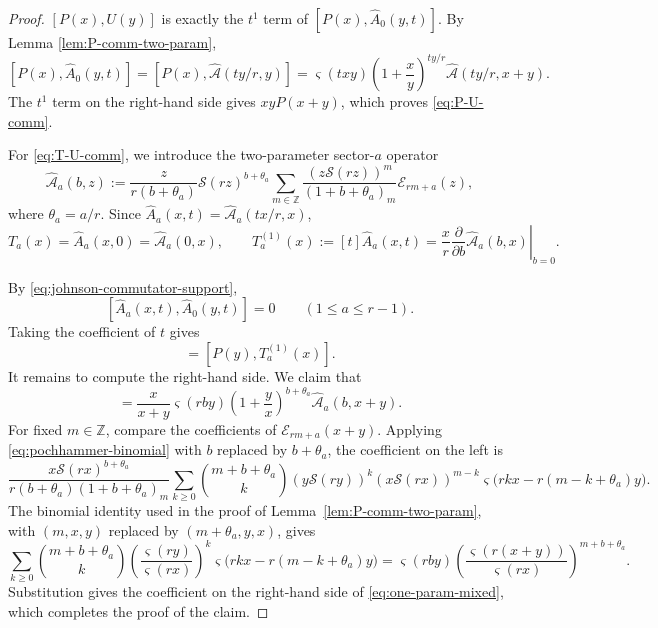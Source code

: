\documentclass[letterpaper,12pt]{amsart}
\theoremstyle{definition}
\newcommand{\Scal}{\mathcal S}
\newcommand{\Ecal}{\mathcal E}
\newcommand{\Z}{\mathbb Z}
\newcommand{\vars}{\varsigma}
\numberwithin{equation}{section}
\begin{document}
\begin{proof}
    $[P(x),U(y)]$ is exactly the $t^1$ term of $[P(x),\widehat A_0(y,t)]$. By Lemma \ref{lem:P-comm-two-param}, 
\[
  [P(x),\widehat A_0(y,t)]=[P(x),\widehat {\mathcal A}(ty/r,y)]
  =\vars(txy)\left(1+\frac xy\right)^{ty/r}\widehat {\mathcal A}(ty/r,x+y).
\]
The $t^1$ term on the right-hand side gives \(xyP(x+y)\), which proves \eqref{eq:P-U-comm}.

For \eqref{eq:T-U-comm}, we introduce the two-parameter sector-\(a\) operator
\[
  \widehat{\mathcal A}_a(b,z)
  :=
  \frac{z}{r(b+\theta_a)}\Scal(rz)^{b+\theta_a}
  \sum_{m\in\Z}
  \frac{(z\Scal(rz))^m}{(1+b+\theta_a)_m}\Ecal_{rm+a}(z),
\]
where \(\theta_a=a/r\).  Since
\(\widehat A_a(x,t)=\widehat{\mathcal A}_a(tx/r,x)\),
\begin{equation}
  T_a(x)
  =
  \widehat A_a(x,0)
  =
  \widehat{\mathcal A}_a(0,x),
  \qquad
  T_a^{(1)}(x)
  :=
  [t]\widehat A_a(x,t)
  =
  \frac{x}{r}
  \left.
    \frac{\partial}{\partial b}\widehat{\mathcal A}_a(b,x)
  \right|_{b=0}.
  \label{eq:Ta1-from-b}
\end{equation}

By
\eqref{eq:johnson-commutator-support},
\[
  [\widehat A_a(x,t),\widehat A_0(y,t)]=0
  \qquad(1\leq a\leq r-1).
\]
Taking the coefficient of \(t\) gives
\begin{equation}
  [T_a(x),U(y)]
  =
  [P(y),T_a^{(1)}(x)].
  \label{eq:first-order-sector-commutativity}
\end{equation}
It remains to compute the right-hand side.  We claim that
\begin{equation}
  [P(y),\widehat{\mathcal A}_a(b,x)]
  =
  \frac{x}{x+y}\vars(rby)
  \left(1+\frac yx\right)^{b+\theta_a}
  \widehat{\mathcal A}_a(b,x+y).
  \label{eq:one-param-mixed}
\end{equation}
For fixed \(m\in\Z\), compare the coefficients of
\(\Ecal_{rm+a}(x+y)\).  Applying \eqref{eq:pochhammer-binomial} with
\(b\) replaced by \(b+\theta_a\), the coefficient on the left is
\[
  \frac{x\Scal(rx)^{b+\theta_a}}
       {r(b+\theta_a)(1+b+\theta_a)_m}
  \sum_{k\geq0}
  \binom{m+b+\theta_a}{k}
  (y\Scal(ry))^k
  (x\Scal(rx))^{m-k}
  \vars\bigl(rkx-r(m-k+\theta_a)y\bigr).
\]
The binomial identity used in the proof of
Lemma~\ref{lem:P-comm-two-param}, with
\((m,x,y)\) replaced by \((m+\theta_a,y,x)\), gives
\[
  \sum_{k\geq0}
  \binom{m+b+\theta_a}{k}
  \left(\frac{\vars(ry)}{\vars(rx)}\right)^k
  \vars\bigl(rkx-r(m-k+\theta_a)y\bigr)
  =
  \vars(rby)
  \left(
    \frac{\vars(r(x+y))}{\vars(rx)}
  \right)^{m+b+\theta_a}.
\]
Substitution gives the coefficient on the right-hand side of
\eqref{eq:one-param-mixed}, which completes the proof of the claim.


\end{proof}
\end{document}
